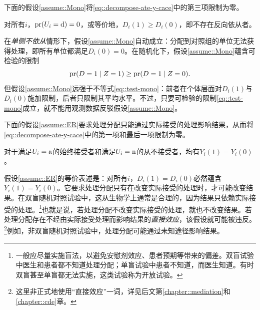 下面的假设\ref{assume::Mono}将\eqref{eq::decompose-ate-y-cace}中的第三项限制为零。 
\begin{assumption}[单调性]
\label{assume::Mono}
对所有$i$，$\textup{pr}(U_i = \textup{d}) = 0$，或等价地，$D_i(1)\geq D_i(0)$，即不存在反向依从者。 
\end{assumption}

在{\it 单侧不依从}情形下，假设\ref{assume::Mono}自动成立：分配到对照组的单位无法获得处理，即所有单位都满足$D_i(0) = 0$。在随机化下，假设\ref{assume::Mono}蕴含可检验的限制
\begin{equation}
\label{eq::test-mono}
\textup{pr}(D=1\mid Z=1) \geq \textup{pr}(D=1\mid Z=0).
\end{equation}
但假设\ref{assume::Mono}远强于不等式\eqref{eq::test-mono}：前者在个体层面对$D_i(1)$与$D_i(0)$施加限制，后者只限制其平均水平。不过，只要可检验的限制\eqref{eq::test-mono}成立，就不能用观测数据反驳假设\ref{assume::Mono}。 


下面的假设\ref{assume::ER}要求处理分配只能通过实际接受的处理影响结果，从而将\eqref{eq::decompose-ate-y-cace}中的第一项和最后一项限制为零。 
\begin{assumption}[排除限制]
\label{assume::ER}
对于满足$U_i=\textup{a}$的始终接受者和满足$U_i = \textup{n}$的从不接受者，均有$Y_i(1) = Y_i(0)$。 
\end{assumption}


假设\ref{assume::ER}的等价表述是：对所有$i$，$D_i(1) =  D_i(0)$必然蕴含$Y_i(1) =  Y_i(0)$。它要求处理分配只有在改变实际接受的处理时，才可能改变结果。在双盲随机对照试验中，这从生物学上通常是合理的，因为结果只依赖实际接受的处理。\footnote{一般应尽量实施盲法，以避免安慰剂效应、患者预期等带来的偏差。双盲试验中医生和患者都不知道处理分配；单盲试验中患者不知道，而医生知道。有时双盲甚至单盲都无法实施，这类试验称为开放试验。}也就是说，若处理分配不改变实际接受的处理，就也不改变结果。若处理分配存在不经由实际接受处理而影响结果的{\it 直接效应}，该假设就可能被违反。\footnote{这里非正式地使用“直接效应”一词，详见后文第\ref{chapter::mediation}和\ref{chapter::cde}章。}例如，非双盲随机对照试验中，处理分配可能通过未知途径影响结果。 





